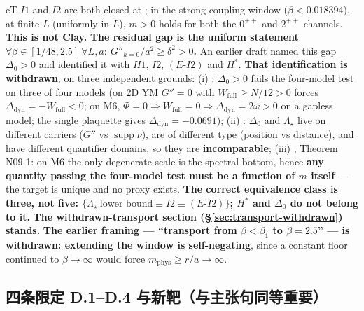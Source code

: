 \begin{claimbox}{cT}
$I1$ and $I2$ are both closed at \code{[T]}; in the strong-coupling window ($\beta<0.018394$), at finite $L$ (uniformly in $L$),
$m>0$ holds for both the $0^{++}$ and $2^{++}$ channels. \textbf{This is not Clay.}
\textbf{The residual gap is the uniform statement $\forall\beta\in[1/48,2.5]\ \forall L,a:\ G''_{k=0}/a^2\ge\delta^2>0$.} An earlier draft named this gap $\Delta_0>0$ and identified it with $H1$, $I2$, $(E\text{-}I2)$ and $H^*$. \textbf{That identification is withdrawn}, on three independent grounds: (i) : $\Delta_0>0$ fails the four-model test on three of four models (on 2D YM $G''=0$ with $W_{\mathrm{full}}\ge N/12>0$ forces $\Delta_{\mathrm{dyn}}=-W_{\mathrm{full}}<0$; on M6, $\Phi=0\Rightarrow W_{\mathrm{full}}=0\Rightarrow\Delta_{\mathrm{dyn}}=2\omega>0$ on a gapless model; the single plaquette gives $\Delta_{\mathrm{dyn}}=-0.0691$); (ii) : $\Delta_0$ and $\Lambda_\star$ live on different carriers ($G''$ vs $\operatorname{supp}\nu$), are of different type (position vs distance), and have different quantifier domains, so they are \textbf{incomparable}; (iii) , Theorem N09-1: on M6 the only degenerate scale is the spectral bottom, hence \textbf{any quantity passing the four-model test must be a function of $m$ itself} --- the target is unique and no proxy exists. \textbf{The correct equivalence class is three, not five: $\{\Lambda_\star\ \text{lower bound}\equiv I2\equiv(E\text{-}I2)\}$; $H^*$ and $\Delta_0$ do not belong to it.} \textbf{The withdrawn-transport section (\S\ref{sec:transport-withdrawn}) stands.}
\textbf{The earlier framing --- ``transport from $\beta<\beta_1$ to $\beta=2.5$'' --- is withdrawn: extending the window is self-negating},
since a constant floor continued to $\beta\to\infty$ would force $m_{\mathrm{phys}}\ge r/a\to\infty$.
\end{claimbox}

\subsection{四条限定 D.1--D.4 与新靶（与主张句同等重要）}\label{sec:u1-d}

